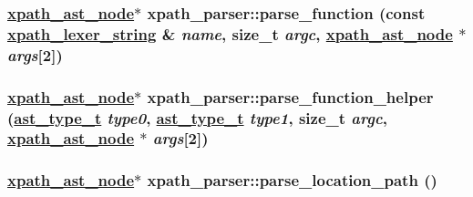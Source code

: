 \hypertarget{structxpath__parser_7acb32147ef3aac058f94257b57ff14f}{
\subsubsection[parse\_\-function]{\setlength{\rightskip}{0pt plus 5cm}\hyperlink{classxpath__ast__node}{xpath\_\-ast\_\-node}$\ast$ xpath\_\-parser::parse\_\-function (const \hyperlink{structxpath__lexer__string}{xpath\_\-lexer\_\-string} \& {\em name}, size\_\-t {\em argc}, \hyperlink{classxpath__ast__node}{xpath\_\-ast\_\-node} $\ast$ {\em args}\mbox{[}2\mbox{]})}}
\label{structxpath__parser_7acb32147ef3aac058f94257b57ff14f}


\hypertarget{structxpath__parser_21a1a2579c610e0ebd76247b9d325bb1}{
\subsubsection[parse\_\-function\_\-helper]{\setlength{\rightskip}{0pt plus 5cm}\hyperlink{classxpath__ast__node}{xpath\_\-ast\_\-node}$\ast$ xpath\_\-parser::parse\_\-function\_\-helper (\hyperlink{pugixml_8cpp_11258a240266b84b6b0526930e5d330d}{ast\_\-type\_\-t} {\em type0}, \hyperlink{pugixml_8cpp_11258a240266b84b6b0526930e5d330d}{ast\_\-type\_\-t} {\em type1}, size\_\-t {\em argc}, \hyperlink{classxpath__ast__node}{xpath\_\-ast\_\-node} $\ast$ {\em args}\mbox{[}2\mbox{]})}}
\label{structxpath__parser_21a1a2579c610e0ebd76247b9d325bb1}


\hypertarget{structxpath__parser_ae61a2931ba0b0c713b5d043f1cef6d4}{
\subsubsection[parse\_\-location\_\-path]{\setlength{\rightskip}{0pt plus 5cm}\hyperlink{classxpath__ast__node}{xpath\_\-ast\_\-node}$\ast$ xpath\_\-parser::parse\_\-location\_\-path ()}}
\label{structxpath__parser_ae61a2931ba0b0c713b5d043f1cef6d4}


